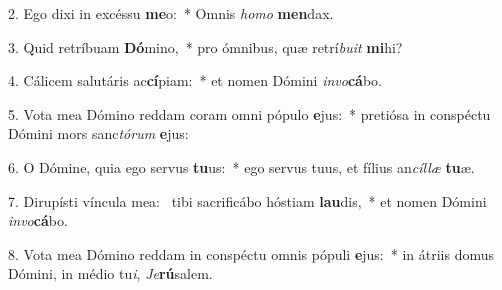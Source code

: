 2. Ego dixi in excéssu \textbf{me}o:~*  Omnis \textit{ho}\textit{mo} \textbf{men}dax.\

3. Quid retríbuam \textbf{Dó}mino,~*  pro ómnibus, quæ retrí\textit{bu}\textit{it} \textbf{mi}hi?\

4. Cálicem salutáris ac\textbf{cí}piam:~*  et nomen Dómini \textit{in}\textit{vo}\textbf{cá}bo.\

5. Vota mea Dómino reddam coram omni pópulo \textbf{e}jus:~*  pretiósa in conspéctu Dómini mors sanc\textit{tó}\textit{rum} \textbf{e}jus:\

6. O Dómine, quia ego servus \textbf{tu}us:~*  ego servus tuus, et fílius an\textit{cíl}\textit{læ} \textbf{tu}æ.\

7. Dirupísti víncula mea: \dag\  tibi sacrificábo hóstiam \textbf{lau}dis,~*  et nomen Dómini \textit{in}\textit{vo}\textbf{cá}bo.\

8. Vota mea Dómino reddam in conspéctu omnis pópuli \textbf{e}jus:~*  in átriis domus Dómini, in médio tu\textit{i}, \textit{Je}\textbf{rú}salem.\

